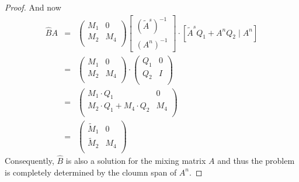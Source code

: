 \documentclass[a4paper, 12pt, titlepage]{article}
\begin{document}
\begin{proof}
	And now
	\begin{eqnarray}
		\hat B A &=& \left(
		\begin{array}{cc}
			M_1& 0\\
			M_2 & M_4 \\
		\end{array}
		\right) \left[
		\begin{matrix}
		(\tilde A^s)^{-1}\\
		\hline
		(A^n)^{-1}		
		\end{matrix} \right] \cdot \left  [ \tilde A^s Q_1 + A^n Q_2 \mid A^n \right] \\
		&=&  \left(
		\begin{array}{cc}
			M_1& 0\\
			M_2 & M_4 \\
		\end{array}
		\right) \cdot \left(
		\begin{array}{cc}
			Q_1& 0\\
			Q_2 & I \\
		\end{array}
		\right)\\
		&=& \left(
		\begin{array}{cc}
			M_1 \cdot Q_1& 0\\
			M_2\cdot Q_1 + M_4 \cdot Q_2 & M_4 \\
		\end{array}
		\right)\\
		&=&  \left(
		\begin{array}{cc}
			\tilde M_1 & 0\\
			\tilde M_2 & M_4 \\
		\end{array}
		\right)
	\end{eqnarray}
	Consequently, $\hat B$ is also a solution for the mixing matrix $A$ and thus the problem is completely determined by the cloumn span of $A^n$.
\end{proof}
\end{document}
